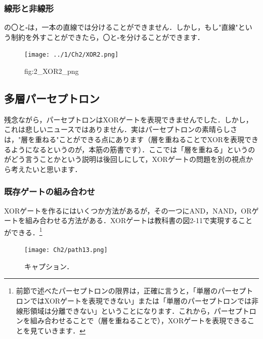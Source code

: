 \subsubsection{線形と非線形}
の〇と$\square$は，一本の直線では分けることができません．しかし，もし"直線"という制約を外すことができたら，〇と$\square$を分けることができます．
\begin{figure}[htb]
    \vspace{0mm}
    \begin{center}
      \hspace{0mm}
      \centering
      \texttt{[image: ../1/Ch2/XOR2.png]} \
      \vspace{0mm}
      \caption{fig:2\_XOR2\_png}
      \label{fig:2_XOR2_png}
    \end{center}
  \end{figure}

\subsection{多層パーセプトロン}
残念ながら，パーセプトロンはXORゲートを表現できませんでした．しかし，これは悲しいニュースではありません．実はパーセプトロンの素晴らしさは，"層を重ねる"ことができる点にあります（層を重ねることでXORを表現できるようになるというのが，本筋の筋書です）．ここでは「層を重ねる」というのがどう言うことかという説明は後回しにして，XORゲートの問題を別の視点から考えたいと思います．
\subsubsection{既存ゲートの組み合わせ}
XORゲートを作るにはいくつか方法があるが，その一つにAND，NAND，ORゲートを組み合わせる方法がある．XORゲートは教科書の図2-11で実現することができる．\footnote{前節で述べたパーセプトロンの限界は，正確に言うと，「単層のパーセプトロンではXORゲートを表現できない」または「単層のパーセプトロンでは非線形領域は分離できない」ということになります．これから，パーセプトロンを組み合わせることで（層を重ねることで），XORゲートを表現できることを見ていきます．}

\begin{figure}[h]
  \vspace{0mm}
  \begin{center}
    \hspace{0mm}
    \centering
    \texttt{[image: Ch2/path13.png]} \
    \vspace{0mm}
    \caption{キャプション．}
    \label{fig:ラベル}
  \end{center}
\end{figure}

